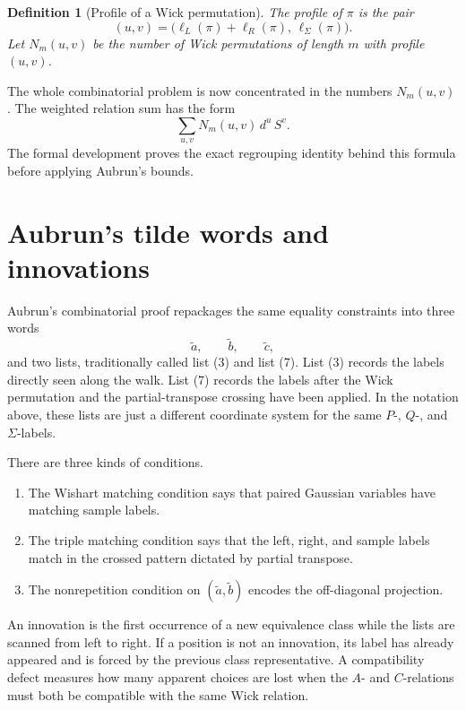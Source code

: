 \documentclass[11pt,oneside]{book}
\newtheorem{definition}[theorem]{Definition}
\newcommand{\1}{\mathbf 1}
\begin{document}
\begin{definition}[Profile of a Wick permutation]
The profile of \(\pi\) is the pair
\[
  (u,v)
  =
  \bigl(\ell_L(\pi)+\ell_R(\pi),\,\ell_\Sigma(\pi)\bigr).
\]
Let \(N_m(u,v)\) be the number of Wick permutations of length \(m\) with
profile \((u,v)\).
\end{definition}

The whole combinatorial problem is now concentrated in the numbers
\(N_m(u,v)\).  The weighted relation sum has the form
\[
  \sum_{u,v} N_m(u,v)\,d^u\,S^v.
\]
The formal development proves the exact regrouping identity behind this
formula before applying Aubrun's bounds.

\section{Aubrun's tilde words and innovations}

Aubrun's combinatorial proof repackages the same equality constraints into
three words
\[
  \widetilde a,\qquad \widetilde b,\qquad \widetilde c,
\]
and two lists, traditionally called list (3) and list (7).  List (3) records
the labels directly seen along the walk.  List (7) records the labels after
the Wick permutation and the partial-transpose crossing have been applied.
In the notation above, these lists are just a different coordinate system for
the same \(P\)-, \(Q\)-, and \(\Sigma\)-labels.

There are three kinds of conditions.

\begin{enumerate}[label=(\roman*)]
\item The Wishart matching condition says that paired Gaussian variables have
matching sample labels.
\item The triple matching condition says that the left, right, and sample
labels match in the crossed pattern dictated by partial transpose.
\item The nonrepetition condition on \((\widetilde a,\widetilde b)\) encodes
the off-diagonal projection.
\end{enumerate}

An innovation is the first occurrence of a new equivalence class while the
lists are scanned from left to right.  If a position is not an innovation,
its label has already appeared and is forced by the previous class
representative.  A compatibility defect measures how many apparent choices
are lost when the \(A\)- and \(C\)-relations must both be compatible with the
same Wick relation.
\end{document}
